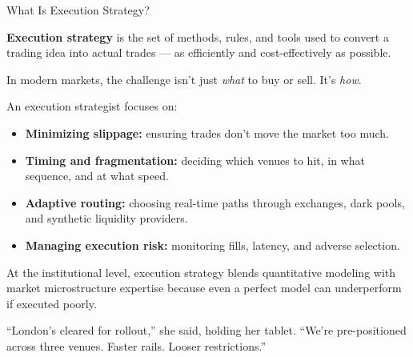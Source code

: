\begin{TechnicalSidebar}{What Is Execution Strategy?}

  \textbf{Execution strategy} is the set of methods, rules, and tools used to convert a trading idea into actual trades — 
  as efficiently and cost-effectively as possible.
  
  \medskip
  
  In modern markets, the challenge isn’t just \textit{what} to buy or sell. It’s \textit{how}.
  
  \medskip
  
  An execution strategist focuses on:
  
  \begin{itemize}
    \item \textbf{Minimizing slippage:} ensuring trades don’t move the market too much.
    \item \textbf{Timing and fragmentation:} deciding which venues to hit, in what sequence, and at what speed.
    \item \textbf{Adaptive routing:} choosing real-time paths through exchanges, dark pools, and synthetic liquidity 
    providers.
    \item \textbf{Managing execution risk:} monitoring fills, latency, and adverse selection.
  \end{itemize}
  
  \medskip
  
  At the institutional level, execution strategy blends quantitative modeling with market microstructure expertise 
  because even a perfect model can underperform if executed poorly.
  
\end{TechnicalSidebar}

\medskip

“London’s cleared for rollout,” she said, holding her tablet. “We’re pre-positioned across three venues. Faster rails. 
Looser restrictions.”

\medskip


